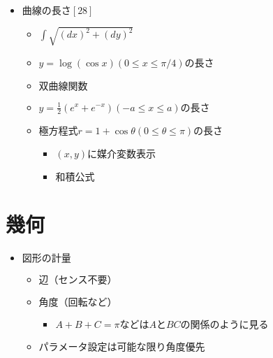 \documentclass[dvipdfmx,uplatex]{jsarticle}
\begin{document}
\begin{itemize}
\begin{itemize}
	\end{itemize}
	\item $ 曲線の長さ[28]$
	\begin{itemize}
		\item $ \int \sqrt{(dx)^2 + (dy)^2}$
		\item $ y= \log ( \cos x) (0 \leq x \leq \pi / 4)の長さ$
		\item $ 双曲線関数$
		\item $ y = \frac{1}{2}(e^x + e^{-x})(-a \leq x \leq a)の長さ$
		\item $ 極方程式r=1+ \cos \theta (0 \leq \theta \leq \pi)の長さ$
		\begin{itemize}
			\item $(x,y)に媒介変数表示$
			\item $和積公式$
		\end{itemize}
	\end{itemize}
\end{itemize}

\section{幾何}
\begin{itemize}
	\item $ 図形の計量$
	\begin{itemize}
		\item $ 辺（センス不要）$
		\item $ 角度（回転など）$
		\begin{itemize}
			\item $ A+B+C= \pi などはAとBCの関係のように見る$
		\end{itemize}
		\item $ パラメータ設定は可能な限り角度優先$
	\end{itemize}
\end{itemize}
\end{document}
